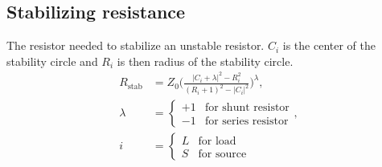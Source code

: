 \documentclass[12pt,a4paper]{article}
\begin{document}
\subsection{Stabilizing resistance}
The resistor needed to stabilize an unstable resistor. $C_i$ is the center of the stability circle and $R_i$ is then radius of the stability circle.
\begin{subequations}
  \label{eq:stabilize}
  \begin{align}
    R_\text{stab} &= Z_0\bigg(\frac{|C_i+\lambda|^2-R^2_i}{(R_i+1)^2-|C_i|^2}\bigg)^\lambda, \\
    \lambda &= 
    \begin{cases}
      +1 & \text{for shunt resistor} \\
      -1 & \text{for series resistor}
    \end{cases}, \\
    i &= 
    \begin{cases}
      L & \text{for load} \\
      S & \text{for source}
    \end{cases}
  \end{align}
\end{subequations}
\end{document}
